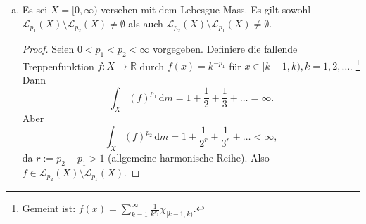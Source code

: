 \documentclass[10pt]{article}\usepackage[]{graphicx}\usepackage[]{color}
\newcommand{\N}{\mathbb{N}}
\newcommand{\R}{\mathbb{R}}
\newcommand{\C}{\mathbb{C}}
\newcommand{\df}{\,\textrm{d}}
\begin{document}
\begin{enumerate}[(a)]
\begin{proof}
          Im unendlichen Fall heisst
          \[
            \sum_{k=1}^{\infty} |f(x_k)|^{p_1} < \infty,
          \]
          dass diese Reihe absolut konvergiert. Also
          dürfen wir die Summanden so umordnen, dass
          $|f(x_k)|^{p_1} \geq |f(x_{k+1})|^{p_1}$ für alle $k \in \N$.
          Wegen der Konvergenz muss weiter ein $N \in \N$
          existieren, sodass $|f(x_k)|^{p_1} < 1$
          für alle $k \geq N$. Da $p_2 > p_1$, gilt für solche
          $k$ dann
          $|f(x_k)|^{p_2} \leq  |f(x_k)|^{p_1}$. Also
          \begin{align*}
            \sum_{k=1}^{\infty} |f(x_k)|^{p_2}
            &= \sum_{k=1}^{N-1} |f(x_k)|^{p_2} + \sum_{k=N}^{\infty} |f(x_k)|^{p_2}.
          \end{align*}
          Der erste Teil ist endlich, also konvergent;
          der zweite Teil wird von der konvergenten
          Reihe $\sum_{k=N}^{\infty} |f(x_k)|^{p_1}$
          majorisiert und ist also auch konvergent.
          Somit 
          $\mathscr{L}_{p_1}(\mu) \subset \mathscr{L}_{p_2}(\mu)$.
          
          Betrachten wir jedoch zu vorgegebenem $p_1$
          und $X = \{x_1, x_2, \dots\}$
          die Abbildung
          \begin{align*}
            f:  X     &\to       \C,\\
                x_k   &\mapsto   k^{-1/p_1},
          \end{align*}
          so stellen wir fest, dass für $p_2 > p_1$ gilt:
          \[
            \sum_{k=1}^{\infty} |f(x_k)|^{p_2} = \sum_{k=1}^{\infty} \frac{1}{k^{p_2/p_1}} < \infty,
          \]
          da $p_2/p_1 > 1$ (allgemeine harmonische Reihe).
          Jedoch
          \[
            \sum_{k=1}^{\infty} |f(x_k)|^{p_1} = \sum_{k=1}^{\infty} \frac{1}{k},
          \]
          was gegen $\infty$ divergiert.
          Also ist die obige Inklusion strikt.
        \end{proof}
        
  \item Es sei $X = [0, \infty)$ versehen mit dem Lebesgue-Mass.
        Es gilt sowohl $\mathscr{L}_{p_1}(X) \setminus \mathscr{L}_{p_2}(X) \neq \emptyset$ als auch
        $\mathscr{L}_{p_2}(X) \setminus \mathscr{L}_{p_1}(X) \neq \emptyset$.
        
        \begin{proof}
          Seien $0 < p_1 < p_2 < \infty$ vorgegeben.
          Definiere die fallende Treppenfunktion $f: X \to \R$ durch
          $f(x) = k^{-p_1}$ für $x \in [k-1, k), k = 1, 2, \dots$.
          \footnote{Gemeint ist: $f(x) = \sum_{k=1}^{\infty} \frac{1}{k^{p_1}} \chi_{[k-1,k)}$.}
          Dann 
          \[
            \int_X (f)^{p_1} \df m = 1 + \frac{1}{2} + \frac{1}{3} + \dots = \infty.
          \]
          Aber
          \[
            \int_X (f)^{p_2} \df m = 1 + \frac{1}{2^r} + \frac{1}{3^r} + \dots < \infty,
          \]
          da $r := p_2-p_1 > 1$ (allgemeine harmonische Reihe).
          Also $f \in \mathscr{L}_{p_2}(X) \setminus \mathscr{L}_{p_1}(X)$.
          

\end{proof}
\end{enumerate}
\end{document}
